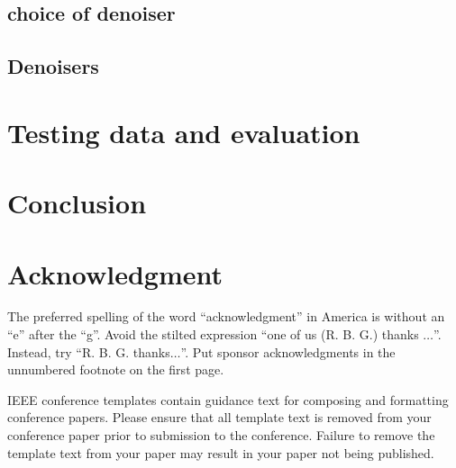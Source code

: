 \documentclass[conference]{IEEEtran}
\begin{document}
\subsection{choice of denoiser}

\subsection{Denoisers}

\section{Testing data and evaluation}\label{sec:eval}


\section{Conclusion}

\section*{Acknowledgment}

The preferred spelling of the word ``acknowledgment'' in America is without 
an ``e'' after the ``g''. Avoid the stilted expression ``one of us (R. B. 
G.) thanks $\ldots$''. Instead, try ``R. B. G. thanks$\ldots$''. Put sponsor 
acknowledgments in the unnumbered footnote on the first page.




\vspace{12pt}
\color{red}
IEEE conference templates contain guidance text for composing and formatting conference papers. Please ensure that all template text is removed from your conference paper prior to submission to the conference. Failure to remove the template text from your paper may result in your paper not being published.
\end{document}

